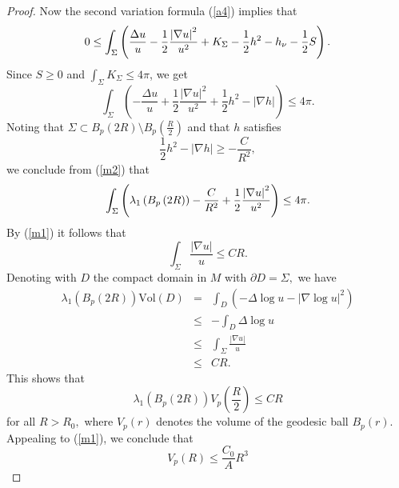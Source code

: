 \documentclass[10pt,a4paper]{amsart}
\numberwithin{equation}{section}
\begin{document}
\begin{proof}
Now the second variation formula (\ref{a4}) implies that
\begin{equation*}
0\leq \int_{\Sigma }\left( \frac{\Delta u}{u}-\frac{1}{2}\frac{\left\vert
\nabla u\right\vert ^{2}}{u^{2}}+K_{\Sigma }-\frac{1}{2}h^{2}-h_{\nu }-\frac{%
1}{2}S\right) .
\end{equation*}%
Since $S\geq 0$ and $\int_{\Sigma }K_{\Sigma }\leq 4\pi $, we get 
\begin{equation}
\int_{\Sigma }\left( -\frac{\Delta u}{u}+\frac{1}{2}\frac{\left\vert \nabla
u\right\vert ^{2}}{u^{2}}+\frac{1}{2}h^{2}-\left\vert \nabla h\right\vert
\right) \leq 4\pi .  \label{m2}
\end{equation}%
Noting that $\Sigma \subset B_{p}\left( 2R\right)\setminus B_{p}\left( \frac{R}{2}\right) $ and that
$h$ satisfies
\begin{equation*}
\frac{1}{2}h^{2}-\left\vert \nabla h\right\vert \geq -\frac{C}{R^{2}},
\end{equation*}%
we conclude from (\ref{m2}) that 
\begin{equation*}
\int_{\Sigma }\left( \lambda _{1}\left( B_{p}\left( 2R\right) \right) -\frac{%
C}{R^{2}}+\frac{1}{2}\frac{\left\vert \nabla u\right\vert ^{2}}{u^{2}}%
\right) \leq 4\pi .
\end{equation*}%
By (\ref{m1}) it follows that 
\begin{equation}
\int_{\Sigma }\frac{\left\vert \nabla u\right\vert }{u}\leq CR.  \label{m3}
\end{equation}%
Denoting with $D$ the compact domain in $M$ with $\partial D=\Sigma,$ we have
\begin{eqnarray*}
\lambda _{1}\left( B_{p}\left( 2R\right) \right) \mathrm{Vol}\left( D\right) 
&=&\int_{D}\left( -\Delta \log u-\left\vert \nabla \log u\right\vert
^{2}\right)  \\
&\leq &-\int_{D}\Delta \log u \\
&\leq &\int_{\Sigma }\frac{\left\vert \nabla u\right\vert }{u} \\
&\leq &CR.
\end{eqnarray*}%
This shows that 
\begin{equation}
\lambda _{1}\left( B_{p}\left( 2R\right) \right) V_{p}\left( \frac{R}{2}%
\right) \leq CR  \label{m4}
\end{equation}%
for all $R>R_{0},$ where $V_p(r)$ denotes the volume of the geodesic ball $B_p(r).$
Appealing to (\ref{m1}), we conclude that 
\begin{equation}
V_{p}\left( R\right) \leq \frac{C_{0}}{A}R^{3}  \label{m5}

\end{equation}
\end{proof}
\end{document}
